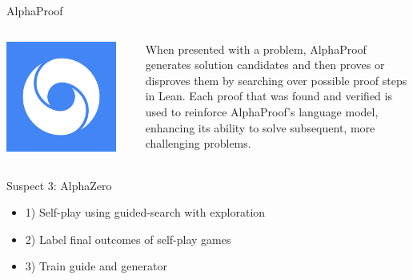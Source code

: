 \documentclass[14pt,aspectratio=169]{beamer}
\begin{document}
\begin{frame}{AlphaProof}
	\centering
	\begin{columns}
		\begin{column}{0.3\textwidth}
			\includegraphics[width=0.9\textwidth]{images/gdm}
		\end{column}
		\begin{column}{0.65\textwidth}
			\begin{tcolorbox}[colback=white,colframe=black,boxrule=0.5pt]
				When presented with a problem, AlphaProof generates solution candidates and then proves or disproves
				them by searching over possible proof steps in Lean.
				Each proof that was found and verified is used to reinforce AlphaProof’s language model,
				enhancing its ability to solve subsequent, more challenging problems.
			\end{tcolorbox}
		\end{column}
	\end{columns}
\end{frame}

\begin{frame}{Suspect 3: AlphaZero}
	\begin{itemize}
		\item 1) Self-play using guided-search with exploration
		\item 2) Label final outcomes of self-play games
		\item 3) Train guide and generator
	\end{itemize}
\end{frame}
\end{document}
